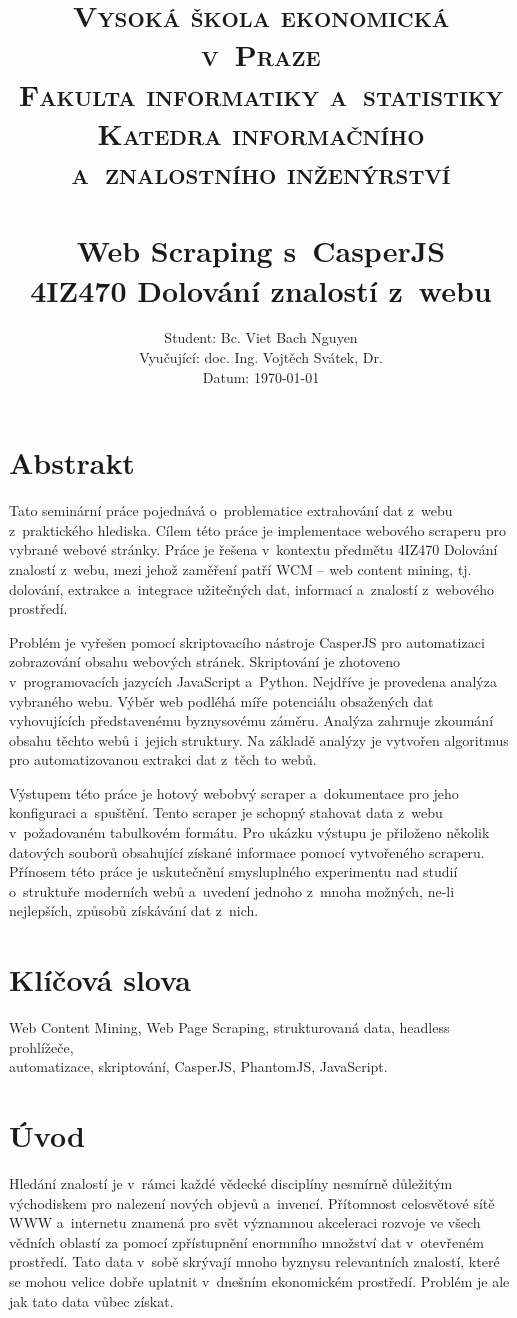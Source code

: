\documentclass[11pt,a4paper]{article}
\title{   \normalsize\textsc {
          \large{Vysoká škola ekonomická v~Praze}\\[0.3cm]    
          \large{Fakulta informatiky a~statistiky}\\[0.3cm]
          \large{Katedra informačního a~znalostního inženýrství}\\
        }
\textsc{}                                               %
            \\[7.0cm]                                   %
            \huge \textbf{Web Scraping s~CasperJS}      %
            \HRule{2pt} \\ [0.4cm]                      %
            \normalsize \textbf{4IZ470 Dolování znalostí z~webu}
        }
\author{\raggedright
        \normalsize
        Student: Bc. Viet Bach Nguyen \\
        \normalsize
        Vyučující: doc. Ing. Vojtěch Svátek, Dr. \\
        \normalsize 
        Datum: \today
}
\makeatletter
\def\printtitle{                       
    {\centering \@title\par}}
\def\printauthor{                   
    {\centering \large \@author}}
\makeatother
\begin{document}
\thispagestyle{empty}           %

\printtitle                     %
      \vfill
\printauthor                    %
\newpage


\setcounter{page}{1}

\section*{Abstrakt}
Tato seminární práce pojednává o~problematice extrahování dat z~webu z~praktického hlediska. Cílem této práce je implementace webového scraperu pro vybrané webové stránky. Práce je řešena v~kontextu předmětu 4IZ470 Dolování znalostí z~webu, mezi jehož zaměření patří WCM -- web content mining, tj. dolování, extrakce a~integrace užitečných dat, informací a~znalostí z~webového prostředí. 

Problém je vyřešen pomocí skriptovacího nástroje CasperJS pro automatizaci zobrazování obsahu webových stránek. Skriptování je zhotoveno v~programovacích jazycích JavaScript a~Python. Nejdříve je provedena analýza vybraného webu. Výběr web podléhá míře potenciálu obsažených dat vyhovujících představenému byznysovému záměru. Analýza zahrnuje zkoumání obsahu těchto webů i~jejich struktury. Na základě analýzy je vytvořen algoritmus pro automatizovanou extrakci dat z~těch to webů. 

Výstupem této práce je hotový webobvý scraper a~dokumentace pro jeho konfiguraci a~spuštění. Tento scraper je schopný stahovat data z~webu v~požadovaném tabulkovém formátu. Pro ukázku výstupu je přiloženo několik datových souborů obsahující získané informace pomocí vytvořeného scraperu. Přínosem této práce je uskutečnění smysluplného experimentu nad studií o~struktuře moderních webů a~uvedení jednoho z~mnoha možných, ne-li nejlepších, způsobů získávání dat z~nich.

\section*{Klíčová slova}
Web Content Mining, Web Page Scraping, strukturovaná data, headless prohlížeče,\\ automatizace, skriptování, CasperJS, PhantomJS, JavaScript.

\newpage

 
\tableofcontents

\newpage

\section{Úvod}
Hledání znalostí je v~rámci každé vědecké disciplíny nesmírně důležitým východiskem pro nalezení nových objevů a~invencí. Přítomnost celosvětové sítě WWW a~internetu znamená pro svět významnou akceleraci rozvoje ve všech vědních oblastí za pomocí zpřístupnění enormního množství dat v~otevřeném prostředí. Tato data v~sobě skrývají mnoho byznysu relevantních znalostí, které se mohou velice dobře uplatnit v~dnešním ekonomickém prostředí. Problém je ale jak tato data vůbec získat.
\end{document}
